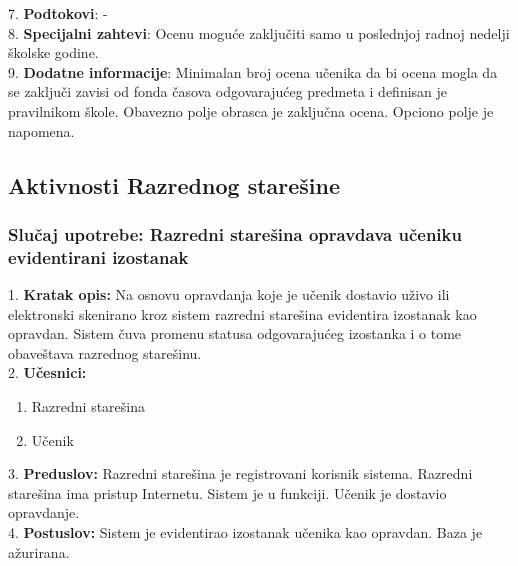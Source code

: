 \documentclass{article}
\begin{document}
7. \textbf{Podtokovi}: - \\

8. \textbf{Specijalni zahtevi}: Ocenu moguće zaključiti samo u poslednjoj radnoj nedelji školske godine. \\

9. \textbf{Dodatne informacije}: Minimalan broj ocena učenika da bi ocena mogla da se zaključi zavisi od fonda časova odgovarajućeg predmeta i definisan je pravilnikom škole. Obavezno polje obrasca je zaključna ocena. Opciono polje je napomena. \\

\newpage
\subsection{Aktivnosti Razrednog starešine}

\subsubsection{Slučaj upotrebe: Razredni starešina opravdava učeniku evidentirani izostanak}
1. \textbf{Kratak opis:} Na osnovu opravdanja koje je učenik dostavio uživo ili elektronski skenirano kroz sistem razredni starešina evidentira izostanak kao opravdan. Sistem čuva promenu statusa odgovarajućeg izostanka i o tome obaveštava razrednog starešinu. \\

2. \textbf{Učesnici:}
\begin{enumerate} [label=(\alph*)]
\item Razredni starešina
\item Učenik
\end{enumerate} 

3. \textbf{Preduslov:} Razredni starešina je registrovani korisnik sistema. Razredni starešina ima pristup Internetu. Sistem je u funkciji. Učenik je dostavio opravdanje. \\

4. \textbf{Postuslov:} Sistem je evidentirao izostanak učenika kao opravdan. Baza je ažurirana. \\
\end{document}
